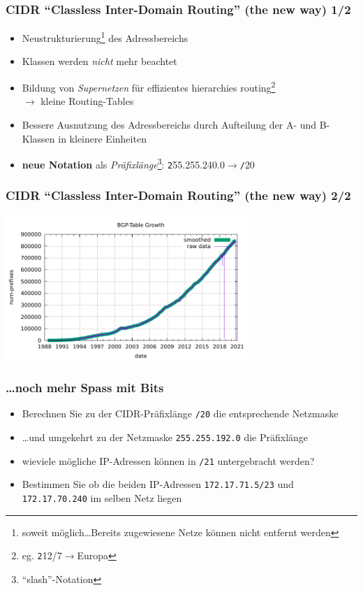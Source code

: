 \documentclass{beamer}
\begin{document}
\begin{frame}
\frametitle{CIDR ``Classless Inter-Domain Routing'' (the new way) 1/2}
\begin{itemize}
	\item{Neustrukturierung\footnote{soweit m\"oglich\ldots Bereits zugewiesene Netze k\"onnen nicht entfernt werden} des Adressbereichs}
	\item{Klassen werden {\em nicht} mehr beachtet}
	\item{Bildung von {\em Supernetzen} f\"ur effizientes hierarchies routing\footnote{eg. {\texttt 212/7$\rightarrow$Europa}}\\$\rightarrow$ kleine Routing-Tables}
	\item{Bessere Ausnutzung des Adressbereichs durch Aufteilung der A- und B-Klassen in kleinere Einheiten}
  \item{{\bfseries neue Notation} als {\em Pr\"afixl\"ange}\footnote{``slash''-Notation}: {\texttt 255.255.240.0}$\rightarrow${\texttt /20}}
\end{itemize}
\end{frame}

\begin{frame}
\frametitle{CIDR ``Classless Inter-Domain Routing'' (the new way) 2/2}
\begin{center}
\includegraphics[height=5.5cm]{bgp-growth.pdf}
\end{center}
{\tiny }
\end{frame}

\begin{frame}
\frametitle{\ldots noch mehr Spass mit Bits}
\begin{itemize}
\item{Berechnen Sie zu der CIDR-Pr\"afixl\"ange \texttt{/20} die entsprechende Netzmaske}
\item{\ldots und umgekehrt zu der Netzmaske \texttt{255.255.192.0} die Pr\"afixl\"ange}
\item{wieviele m\"ogliche IP-Adressen k\"onnen in \texttt{/21} untergebracht werden?}
\item{Bestimmen Sie ob die beiden IP-Adressen \texttt{172.17.71.5/23} und \texttt{172.17.70.240} im selben Netz liegen}
\end{itemize}
\end{frame}
\end{document}
